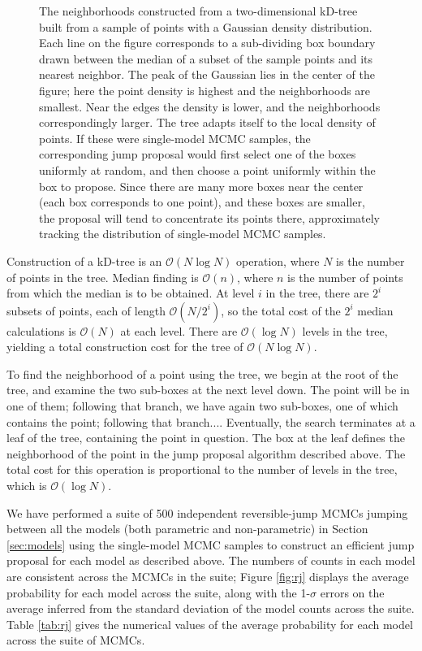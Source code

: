 \documentclass[preprint]{aastex}
\newcommand{\order}[1]{\mathcal{O}\left( #1 \right)}
\begin{document}
\begin{figure}
  \begin{center}
  \end{center}
  \caption{\label{fig:kD-tree} The neighborhoods constructed from a
    two-dimensional kD-tree built from a sample of points with a
    Gaussian density distribution.  Each line on the figure
    corresponds to a sub-dividing box boundary drawn between the
    median of a subset of the sample points and its nearest
    neighbor. The peak of the Gaussian lies in the center of the
    figure; here the point density is highest and the neighborhoods
    are smallest.  Near the edges the density is lower, and the
    neighborhoods correspondingly larger.  The tree adapts itself to
    the local density of points.  If these were single-model MCMC
    samples, the corresponding jump proposal would first select one of
    the boxes uniformly at random, and then choose a point uniformly
    within the box to propose.  Since there are many more boxes near
    the center (each box corresponds to one point), and these boxes
    are smaller, the proposal will tend to concentrate its points
    there, approximately tracking the distribution of single-model
    MCMC samples.}
\end{figure}

Construction of a kD-tree is an $\order{N\log N}$ operation, where $N$
is the number of points in the tree.  Median finding is $\order{n}$,
where $n$ is the number of points from which the median is to be
obtained.  At level $i$ in the tree, there are $2^i$ subsets of
points, each of length $\order{N/2^i}$, so the total cost of the $2^i$
median calculations is $\order{N}$ at each level.  There are
$\order{\log N}$ levels in the tree, yielding a total construction
cost for the tree of $\order{N \log N}$.  

To find the neighborhood of a point using the tree, we begin at the
root of the tree, and examine the two sub-boxes at the next level
down.  The point will be in one of them; following that branch, we
have again two sub-boxes, one of which contains the point; following
that branch....  Eventually, the search terminates at a leaf of the
tree, containing the point in question.  The box at the leaf defines
the neighborhood of the point in the jump proposal algorithm described
above.  The total cost for this operation is proportional to the
number of levels in the tree, which is $\order{\log N}$.

We have performed a suite of 500 independent reversible-jump MCMCs
jumping between all the models (both parametric and non-parametric) in
Section \ref{sec:models} using the single-model MCMC samples to
construct an efficient jump proposal for each model as described
above.  The numbers of counts in each model are consistent across the
MCMCs in the suite; Figure \ref{fig:rj} displays the average
probability for each model across the suite, along with the 1-$\sigma$
errors on the average inferred from the standard deviation of the
model counts across the suite.  Table \ref{tab:rj} gives the numerical
values of the average probability for each model across the suite of
MCMCs.
\end{document}
